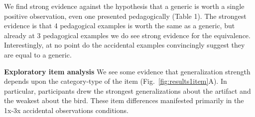 \documentclass[10pt,letterpaper]{article}
\begin{document}
We find strong evidence against the hypothesis that a generic is worth a single positive observation, even one presented pedagogically (Table 1).
The strongest evidence is that 4 pedagogical examples is worth the same as a generic, but already at 3 pedagogical examples we do see strong evidence for the equivalence. 
Interestingly, at no point do the accidental examples convincingly suggest they are equal to a generic.





\noindent\textbf{Exploratory item analysis}
We see some evidence that generalization strength depends upon the category-type of the item (Fig.~\ref{fig:results1item}A).
In particular, participants drew the strongest generalizations about the artifact and the weakest about the bird. 
These item differences manifested primarily in the 1x-3x accidental observations conditions. 
\end{document}
